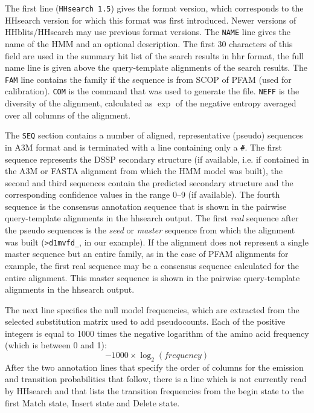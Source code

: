 \documentclass[11pt,a4paper]{article}
\begin{document}
The first line (\verb`HHsearch 1.5`) gives the format version, which corresponds to the HHsearch version for which this format was first introduced. Newer versions of HHblits/HHsearch may use previous format versions. The \verb`NAME` line gives the name of the HMM and an optional description. The first 30 characters of this field are used in the summary hit list of the search results in hhr format, the full name line is given above the query-template alignments of the search results. The \verb`FAM` line contains the family if the sequence is from SCOP of PFAM (used for calibration). \verb`COM` is the command that was used to generate the file. \verb`NEFF` is the diversity of the alignment, calculated as $\exp$ of the negative entropy averaged over all columns of the alignment. 

The \verb`SEQ` section contains a number of aligned, representative (pseudo) sequences in A3M format and is terminated with a line containing only a \verb`#`. The first sequence represents the DSSP secondary structure (if available, i.e. if contained in the A3M or FASTA alignment from which the HMM model was built), the second and third sequences contain the predicted secondary structure and the corresponding confidence values in the range 0--9 (if available). The fourth sequence is the consensus annotation sequence that is shown in the pairwise query-template alignments in the hhsearch output. The first \emph{real} sequence after the pseudo sequences is the \emph{seed} or \emph{master} sequence from which the alignment was built (\verb`>d1mvfd_`, in our example). If the alignment does not represent a single master sequence but an entire family, as in the case of PFAM alignments for example, the first real sequence may be a consensus sequence calculated for the entire alignment. This master sequence is shown in the pairwise query-template alignments in the hhsearch output. 

The next line specifies the null model frequencies, which are extracted from the selected substitution matrix used to add pseudocounts. Each of the positive integers is equal to 1000 times the negative logarithm of the amino acid frequency (which is between 0 and 1):
\begin{equation}
  -1000 \times \log_2( frequency)
  \label{transformation}
\end{equation}
 After the two annotation lines that specify the order of columns for the emission and transition probabilities that follow, there is a line which is not currently read by HHsearch and that lists the transition frequencies from the begin state to the first Match state, Insert state and Delete state.
\end{document}
